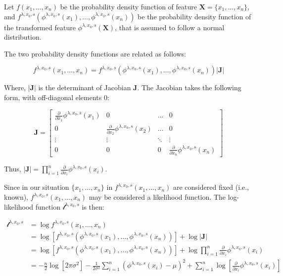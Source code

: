 \documentclass[
  a4paper,
]{article}
\begin{document}
Let \(f(x_1, \ldots, x_n)\) be the probability density function of
feature \(\mathbf{X} = \{ x_1, \ldots, x_n\}\), and
\(f^{\lambda, x_0, s} (\phi^{\lambda, x_0, s}(x_1), \ldots, \phi^{\lambda, x_0, s}(x_n))\)
be the probability density function of the transformed feature
\(\phi^{\lambda, x_0, s} (\mathbf{X})\), that is assumed to follow a
normal distribution.

The two probability density functions are related as follows:

\begin{equation}
f^{\lambda, x_0, s}(x_1, \ldots, x_n) = f^{\lambda, x_0, s} (\phi^{\lambda, x_0, s}(x_1), \ldots, \phi^{\lambda, x_0, s}(x_n)) \left|\mathbf{J}\right|
\end{equation}

Where, \(\left|\mathbf{J}\right|\) is the determinant of Jacobian
\(\mathbf{J}\). The Jacobian takes the following form, with off-diagonal
elements \(0\):

\begin{equation}
\mathbf{J} =
\begin{bmatrix}
    \frac{\partial}{\partial x_1} \phi^{\lambda, x_0, s}(x_1) & 0 & \dots & 0 \\
    0 & \frac{\partial}{\partial x_2} \phi^{\lambda, x_0, s}(x_2) & \dots & 0 \\
    \vdots & \vdots  & \ddots &  \vdots \\
    0  & 0 & 0 & \frac{\partial}{\partial x_n} \phi^{\lambda, x_0, s}(x_n)
\end{bmatrix}
\end{equation}

Thus,
\(\left| \mathbf{J} \right| = \prod_{i=1}^n \frac{\partial}{\partial x_i} \phi^{\lambda, x_0, s}(x_i)\).

Since in our situation \(\{x_1, \ldots, x_n\}\) in
\(f^{\lambda, x_0, s}(x_1, \ldots, x_n)\) are considered fixed (i.e.,
known), \(f^{\lambda, x_0, s}(x_1, \ldots, x_n)\) may be considered a
likelihood function. The log-likelihood function
\(\mathcal{l}^{\lambda, x_0, s}\) is then:

\begin{equation}
\begin{split}
\mathcal{l}^{\lambda, x_0, s} & = \log f^{\lambda, x_0, s}(x_1, \ldots, x_n) \\
 & = \log \left[ f^{\lambda, x_0, s} (\phi^{\lambda, x_0, s}(x_1), \ldots, \phi^{\lambda, x_0, s}(x_n)) \right] + \log \left|\mathbf{J}\right| \\
 & = \log \left[ f^{\lambda, x_0, s} (\phi^{\lambda, x_0, s}(x_1), \ldots, \phi^{\lambda, x_0, s}(x_n)) \right] + \log \prod_{i=1}^n \frac{\partial}{\partial x_i} \phi^{\lambda, x_0, s}(x_i) \\
 & = -\frac{n}{2} \log \left[2 \pi \sigma^2 \right] -\frac{1}{2 \sigma^2} \sum_{i=1}^n \left( \phi^{\lambda, x_0, s}(x_i) - \mu \right)^2 + \sum_{i=1}^n \log \left[ \frac{\partial}{\partial x_i} \phi^{\lambda, x_0, s}(x_i)\right]
\end{split}
\end{equation}
\end{document}
